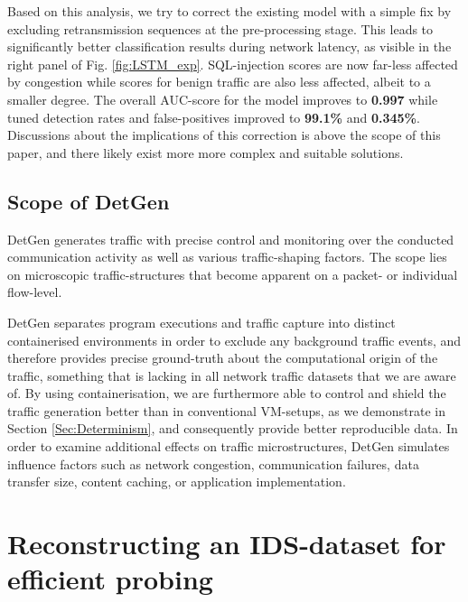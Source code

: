 \documentclass[runningheads]{llncs}
\begin{document}
Based on this analysis, we try to correct the existing model with a simple fix by excluding retransmission sequences at the pre-processing stage. This leads to significantly better classification results during network latency, as visible in the right panel of Fig. \ref{fig:LSTM_exp}. SQL-injection scores are now far-less affected by congestion while scores for benign traffic are also less affected, albeit to a smaller degree.
The overall AUC-score for the model improves to \textbf{0.997} while tuned detection rates and false-positives improved to \textbf{99.1\%} and \textbf{0.345\%}. Discussions about the implications of this correction is above the scope of this paper, and there likely exist more more complex and suitable solutions.


\subsection{Scope of DetGen}

DetGen generates traffic with precise control and monitoring over the conducted communication activity as well as various traffic-shaping factors. The scope lies on microscopic traffic-structures that become apparent on a packet- or individual flow-level.

DetGen separates program executions and traffic capture into distinct containerised environments in order to exclude any background traffic events, and therefore provides precise ground-truth about the computational origin of the traffic, something that is lacking in all network traffic datasets that we are aware of. By using containerisation, we are furthermore able to control and shield the traffic generation better than in conventional VM-setups, as we demonstrate in Section \ref{Sec:Determinism}, and consequently provide better reproducible data. 
In order to examine additional effects on traffic microstructures, DetGen simulates influence factors such as network congestion, communication failures, data transfer size, content caching, or application implementation.

\section{Reconstructing an IDS-dataset for efficient probing}\label{Sec:ProbData}

\end{document}
